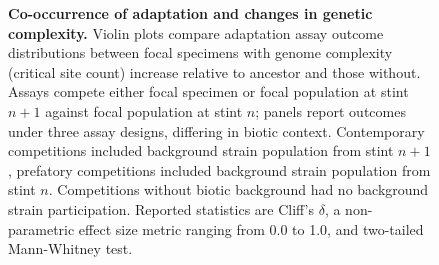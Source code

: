 \begin{figure}
\caption{
    \textbf{Co-occurrence of adaptation and changes in genetic complexity.}
    \footnotesize
    Violin plots compare adaptation assay outcome distributions between focal specimens with genome complexity (critical site count) increase relative to ancestor and those without.
    Assays compete either focal specimen or focal population at stint $n+1$ against focal population at stint $n$;
    panels report outcomes under three assay designs, differing in biotic context.
    Contemporary competitions included background strain population from stint $n+1$, prefatory competitions included background strain population from stint $n$.
    Competitions without biotic background had no background strain participation.
    Reported statistics are Cliff's $\delta$, a non-parametric effect size metric ranging from 0.0 to 1.0, and two-tailed Mann-Whitney test.
}
\label{fig:fitness-gcomplexity}

\end{figure}
